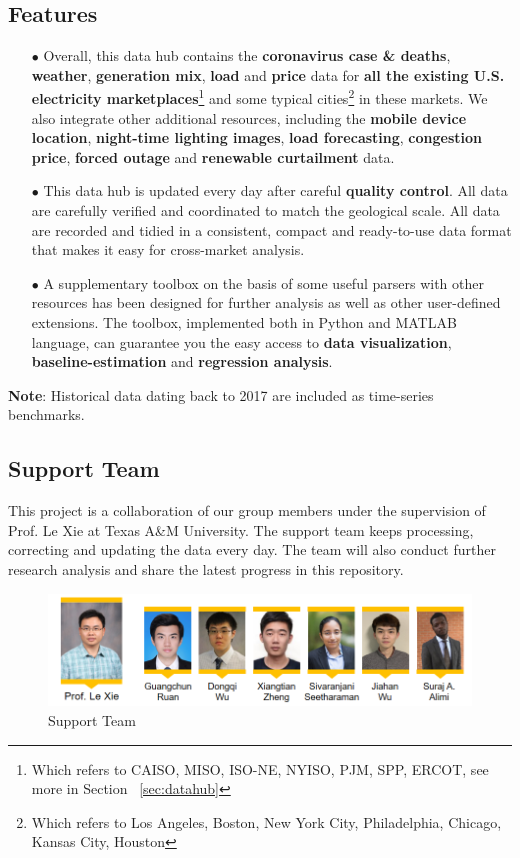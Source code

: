 \documentclass[11pt]{article}
\numberwithin{equation}{section}
\numberwithin{table}{section}
\numberwithin{figure}{section}
\begin{document}
\subsection{Features}
\begin{itemize}
    \item[$\bullet$] Overall, this data hub contains the \textbf{coronavirus case \& deaths}, \textbf{weather}, \textbf{generation mix}, \textbf{load} and \textbf{price} data for \textbf{all the existing U.S. electricity marketplaces}\footnote{Which refers to CAISO, MISO, ISO-NE, NYISO, PJM, SPP, ERCOT, see more in Section ~\ref{sec:datahub}} and some typical cities\footnote{Which refers to Los Angeles, Boston, New York City, Philadelphia, Chicago, Kansas City, Houston} in these markets. We also integrate other additional resources, including the \textbf{mobile device location}, \textbf{night-time lighting images}, \textbf{load forecasting}, \textbf{congestion price}, \textbf{forced outage} and \textbf{renewable curtailment} data. 
    \item[$\bullet$] This data hub is updated every day after careful \textbf{quality control}. All data are carefully verified and coordinated to match the geological scale. All data are recorded and tidied in a consistent, compact and ready-to-use data format that makes it easy for cross-market analysis.
    \item[$\bullet$] A supplementary toolbox on the basis of some useful parsers with other resources has been designed for further analysis as well as other user-defined extensions. The toolbox, implemented both in Python and MATLAB language, can guarantee you the easy access to \textbf{data visualization}, \textbf{baseline-estimation} and \textbf{regression analysis}.
\end{itemize}

\textbf{Note}: Historical data dating back to 2017 are included as time-series benchmarks.

\subsection{Support Team}
This project is a collaboration of our group members under the supervision of Prof. Le Xie at Texas A\&M University. The support team keeps processing, correcting and updating the data every day. The team will also conduct further research analysis and share the latest progress in this repository.

\begin{figure}[!ht]
    \centering
    \includegraphics[width=.8\textwidth]{figures/contributor-0725.png}
    \caption{Support Team}
\end{figure}
\end{document}
